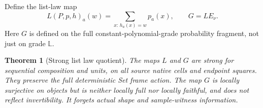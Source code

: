 \documentclass[11pt,a4paper]{article}
\newtheorem{theorem}{Theorem}[section]
\theoremstyle{definition}
\begin{document}
Define the list-law map
\begin{equation}\label{eq:list-law}
 L(P,p,h)_a(w)=\sum_{x:\,h_a(x)=w}p_a(x),\qquad
 G=L E_\nu.
\end{equation}
Here $G$ is defined on the full constant-polynomial-grade probability
fragment, not just on grade $\mathbb L$.

\begin{theorem}[Strong list law quotient]\label{thm:law}
The maps $L$ and $G$ are strong for sequential composition and units, on
all source native cells and endpoint squares. They preserve the full
deterministic Set frame action. The map $G$ is locally surjective on objects
but is neither locally full nor locally faithful, and does not reflect
invertibility. It forgets actual shape and sample-witness information.
\end{theorem}
\end{document}

